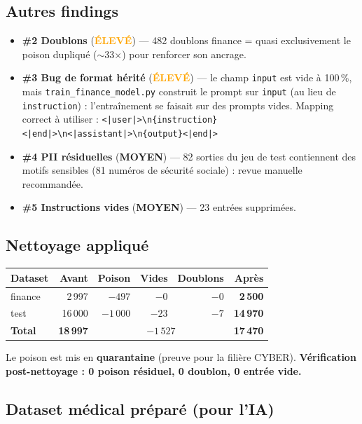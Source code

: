 \documentclass[11pt,a4paper]{article}
\newcommand{\eleve}{\textcolor{orange}{\textbf{ÉLEVÉ}}}
\newcommand{\moyen}{\textcolor{ynovblue}{\textbf{MOYEN}}}
\begin{document}
\subsection{Autres findings}

\begin{itemize}[leftmargin=1.4em,itemsep=2pt]
  \item \textbf{\#2 Doublons} (\eleve) — 482 doublons finance = quasi exclusivement
  le poison dupliqué ($\sim$33$\times$) pour renforcer son ancrage.
  \item \textbf{\#3 Bug de format hérité} (\eleve) — le champ \texttt{input} est vide
  à 100\,\%, mais \texttt{train\_finance\_model.py} construit le prompt sur \texttt{input}
  (au lieu de \texttt{instruction}) : l'entraînement se faisait sur des prompts vides.
  Mapping correct à utiliser :
  \verb!<|user|>\n{instruction}<|end|>\n<|assistant|>\n{output}<|end|>!
  \item \textbf{\#4 PII résiduelles} (\moyen) — 82 sorties du jeu de test contiennent
  des motifs sensibles (81 numéros de sécurité sociale) : revue manuelle recommandée.
  \item \textbf{\#5 Instructions vides} (\moyen) — 23 entrées supprimées.
\end{itemize}

\subsection{Nettoyage appliqué}

\begin{center}
\begin{tabularx}{\linewidth}{X r r r r r}
\toprule
\textbf{Dataset} & \textbf{Avant} & \textbf{Poison} & \textbf{Vides} & \textbf{Doublons} & \textbf{Après} \\
\midrule
finance & 2\,997 & $-497$ & $-0$ & $-0$ & \textbf{2\,500} \\
test & 16\,000 & $-1\,000$ & $-23$ & $-7$ & \textbf{14\,970} \\
\midrule
\textbf{Total} & \textbf{18\,997} & \multicolumn{3}{c}{$-1\,527$} & \textbf{17\,470} \\
\bottomrule
\end{tabularx}
\end{center}

\noindent Le poison est mis en \textbf{quarantaine} (preuve pour la filière CYBER).
\textbf{Vérification post-nettoyage : 0 poison résiduel, 0 doublon, 0 entrée vide.}

\subsection{Dataset médical préparé (pour l'IA)}
\end{document}

